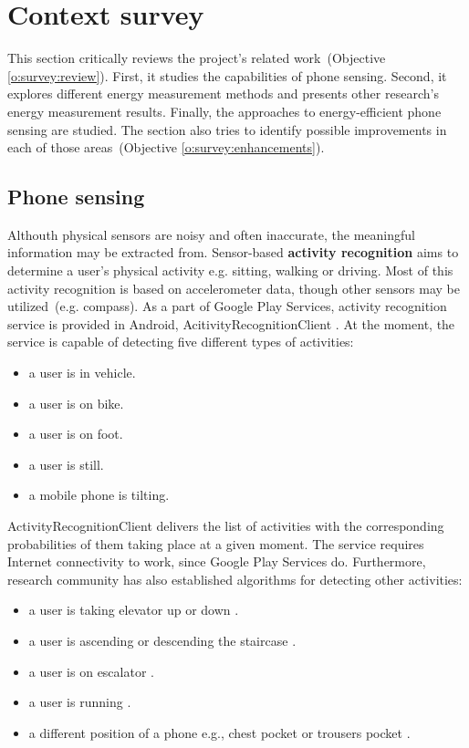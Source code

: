 \section{Context survey}
\label{s:contextsurvey}
\hspace{10pt} This section critically reviews the project's related work\ (Objective \ref{o:survey:review}). First, it studies the capabilities of phone sensing. Second, it explores different energy measurement methods and presents other research's energy measurement results. Finally, the approaches to energy-efficient phone sensing are studied. The section also tries to identify possible improvements in each of those areas\ (Objective \ref{o:survey:enhancements}).

\subsection{Phone sensing}

Althouth physical sensors are noisy and often inaccurate, the meaningful information may be extracted from. \hspace{10pt} Sensor-based \textbf{activity recognition} aims to determine a user's physical activity e.g. sitting, walking or driving. Most of this activity recognition is based on accelerometer data, though other sensors may be utilized\ (e.g. compass). As a part of Google Play Services, activity recognition service is provided in Android, AcitivityRecognitionClient \cite{android:activityrecognition}. At the moment, the service is capable of detecting five different types of activities: 
 \begin{itemize}
  	\item a user is in vehicle.
    \item a user is on bike.
    \item a user is on foot.
    \item a user is still.
    \item a mobile phone is tilting.
  \end{itemize}
  
ActivityRecognitionClient delivers the list of activities with the corresponding probabilities of them taking place at a given moment. The service requires Internet connectivity to work, since Google Play Services do. Furthermore, research community has also established algorithms for detecting other activities:
 \begin{itemize}
  	\item a user is taking elevator up or down \cite{Wang:unsupervised}.
    \item a user is ascending or descending the staircase \cite{Wang:unsupervised}.
    \item a user is on escalator \cite{Wang:unsupervised}.
    \item a user is running \cite{miluzzo:cenceme}.
    \item a different position of a phone e.g., chest pocket or trousers pocket \cite{kawahara:positions}.
  \end{itemize}

